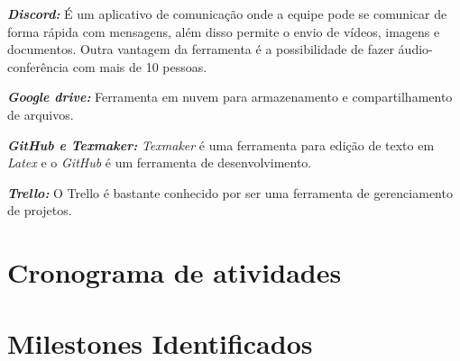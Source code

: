 \emph{\textbf{Discord:}} É um aplicativo de comunicação onde a equipe pode se comunicar de forma rápida com mensagens, além disso permite o envio de vídeos, imagens e documentos. Outra vantagem da ferramenta é a possibilidade de fazer áudio-conferência com mais de 10 pessoas.

\emph{\textbf{Google drive:}} Ferramenta em nuvem para armazenamento e compartilhamento de arquivos.

\emph{\textbf{GitHub e Texmaker:}} \emph{Texmaker} é uma ferramenta para edição de texto em \emph{Latex} e o \emph{GitHub} é um ferramenta de desenvolvimento.

\emph{\textbf{Trello:}} O Trello é bastante conhecido por ser uma ferramenta de gerenciamento de projetos. 

\section{Cronograma de atividades}
\section{Milestones Identificados}


